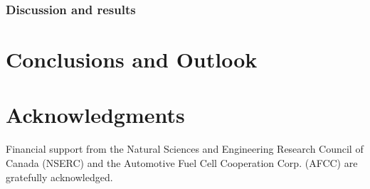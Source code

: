 \documentclass[]{elsart}
\begin{document}
\subsubsection{Discussion and results} \label{sec:input_parameters}


\section{Conclusions and Outlook}


\section*{Acknowledgments}
Financial support from the Natural Sciences and Engineering Research Council of Canada (NSERC) and the Automotive Fuel Cell Cooperation Corp. (AFCC) are gratefully acknowledged.
  
\clearpage




\clearpage


\end{document}
